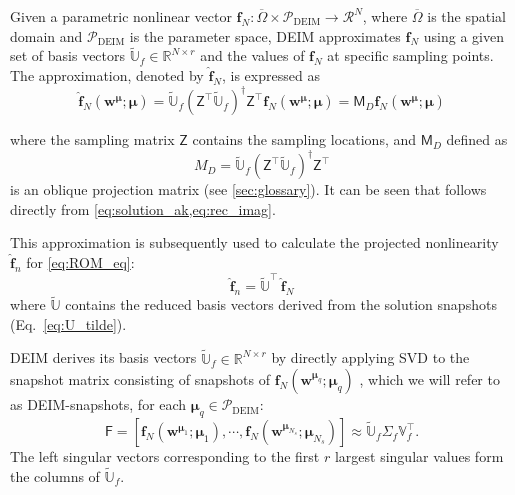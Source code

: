\documentclass[11pt]{article}
\renewcommand{\vec}[1]{\mathbf{#1}}
\newcommand{\mat}[1]{\mathsf{#1}}
\begin{document}
        Given a parametric nonlinear vector $\vec{f}_N: \overline{\Omega} \times \mathcal{P}_{\text{DEIM}} \to \mathcal{R}^N$, where \( \overline{\Omega} \) is the spatial domain and \( \mathcal{P}_{\text{DEIM}} \) is the parameter space, DEIM approximates \( \vec{f}_N \) using a given set of basis vectors \( \widetilde{\mathbb{U}}_f \in \mathbb{R}^{N \times r} \) and the values of $\vec{f}_N$ at specific sampling points.
        The approximation, denoted by $\widehat{\vec{f}}_N$, is expressed as
        \begin{equation}
            \widehat{\vec{f}}_N(\vec{w}^{\boldsymbol{\mu}}; \boldsymbol{\mu}) = \widetilde{\mathbb{U}}_f \left(\mat{Z}^\top \widetilde{\mathbb{U}}_f\right)^{\dagger} \mat{Z}^\top \vec{f}_N(\vec{w}^{\boldsymbol{\mu}}; \boldsymbol{\mu}) = \mat{M}_D \vec{f}_N(\vec{w}^{\boldsymbol{\mu}}; \boldsymbol{\mu})
            \label{eq:deim_approx}
        \end{equation}

        where the sampling matrix $\mat{Z}$ contains the sampling locations, and $\mat{M}_D$  defined as
        \begin{equation}
         M_D = \widetilde{\mathbb{U}}_f \left(\mat{Z}^\top \widetilde{\mathbb{U}}_f\right)^{\dagger} \mat{Z}^\top
         \label{eq:deim_mat}
        \end{equation}
        is an oblique projection matrix (see \cref{sec:glossary}).
        It can be seen that  follows directly from \cref{eq:solution_ak,eq:rec_imag}.


        This approximation is subsequently used to calculate the projected nonlinearity $\widehat{\vec{f}}_n$ for \cref{eq:ROM_eq}:
        \begin{equation}
            \widehat{\vec{f}}_n  = \widetilde{\mathbb{U}}^\top \, \widehat{\vec{f}}_N
            \label{eq:deim_approx_fn}
        \end{equation}
        where $\widetilde{\mathbb{U}}$ contains the reduced basis vectors derived from the solution snapshots (Eq.~\ref{eq:U_tilde}).


        DEIM derives its basis vectors \( \widetilde{\mathbb{U}}_f \in \mathbb{R}^{N \times r} \) by directly applying SVD to the snapshot matrix consisting of snapshots of \( \vec{f}_N(\vec{w}^{\boldsymbol{\mu}_q}; \boldsymbol{\mu}_q) \) , which we will refer to as DEIM-snapshots, for each \( \boldsymbol{\mu}_q \in \mathcal{P}_{\text{DEIM}} \):
        \begin{equation}
        \mat{F} = \left[ \vec{f}_N(\vec{w}^{\boldsymbol{\mu}_1}; \boldsymbol{\mu}_1), \cdots, \vec{f}_N(\vec{w}^{\boldsymbol{\mu}_{N_s}}; \boldsymbol{\mu}_{N_s}) \right] \approx \widetilde{\mathbb{U}}_f \mat{\Sigma}_f \mathbb{V}_f^\top.
        \end{equation}
        The left singular vectors corresponding to the first $r$ largest singular values form the columns of \( \widetilde{\mathbb{U}}_f \).
\end{document}
